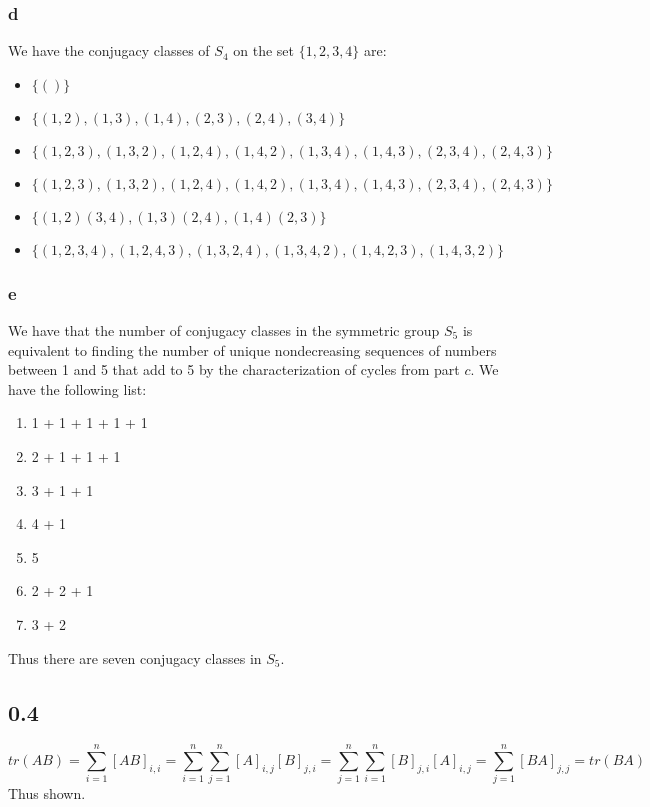\documentclass[]{article}
\begin{document}
\subsubsection*{d}
We have the conjugacy classes of $S_4$ on the set $\lbrace 1, 2, 3, 4 \rbrace$ are: 
\begin{itemize}
	\item $\lbrace () \rbrace$
	\item $\lbrace (1, 2), (1, 3), (1, 4), (2, 3), (2, 4), (3, 4) \rbrace$
	\item $\lbrace (1, 2, 3) , (1,3, 2), (1,2, 4), (1, 4, 2), (1, 3, 4), (1, 4, 3), (2, 3, 4), (2, 4, 3) \rbrace$
	\item $\lbrace (1, 2, 3) , (1,3, 2), (1,2, 4), (1, 4, 2), (1, 3, 4), (1, 4, 3), (2, 3, 4), (2, 4, 3) \rbrace$
	\item $\lbrace (1,2)(3, 4), (1, 3)(2, 4), (1,4)(2,3) \rbrace$
	\item $\lbrace(1, 2, 3, 4), (1, 2, 4, 3), (1, 3, 2, 4), (1, 3, 4, 2), (1, 4, 2, 3), (1, 4, 3, 2) \rbrace$
\end{itemize}

\subsubsection*{e}
We have that the number of conjugacy classes in the symmetric group $S_5$ is equivalent to finding the number of unique nondecreasing sequences of numbers between 1 and 5 that add to 5 by the characterization of cycles from part $c$.
We have the following list:
\begin{enumerate}
	\item 1 + 1 + 1 + 1 + 1
	\item 2 + 1 + 1 + 1
	\item 3 + 1 + 1
	\item 4 + 1
	\item 5
	\item 2 + 2 + 1
	\item 3 + 2
\end{enumerate}
Thus there are seven conjugacy classes in $S_5$.

\subsection*{0.4}
\begin{equation*}
tr(AB) = \sum_{i = 1}^n [AB]_{i,i} = \sum_{i = 1}^n \sum_{j = 1}^n [A]_{i,j} [B]_{j, i } = \sum_{j = 1}^n\sum_{i = 1}^n  [B]_{j, i }[A]_{i,j}   = \sum_{j = 1}^n [BA]_{j,j} = tr(BA)
\end{equation*}
Thus shown. 
\end{document}

